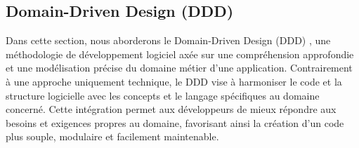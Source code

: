 \subsection{Domain-Driven Design (DDD)}

Dans cette section, nous aborderons le Domain-Driven Design (DDD) \cite{ref11}, une méthodologie de développement logiciel axée sur une compréhension approfondie et une modélisation précise du domaine métier d'une application. Contrairement à une approche uniquement technique, le DDD vise à harmoniser le code et la structure logicielle avec les concepts et le langage spécifiques au domaine concerné. Cette intégration permet aux développeurs de mieux répondre aux besoins et exigences propres au domaine, favorisant ainsi la création d'un code plus souple, modulaire et facilement maintenable.




